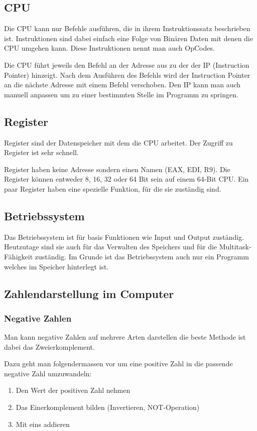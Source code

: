 \documentclass[12pt, a4paper, oneside]{article}
\begin{document}
\subsection{CPU}
Die CPU kann nur Befehle ausführen, die in ihrem Instruktionssatz beschrieben ist. Instruktionen sind dabei einfach eine Folge von Binären Daten mit denen die CPU umgehen kann. Diese Instruktionen nennt man auch OpCodes.

Die CPU führt jeweils den Befehl an der Adresse aus zu der der IP (Instruction Pointer) hinzeigt. Nach dem Ausführen des Befehls wird der Instruction Pointer an die nächste Adresse mit einem Befehl verschoben. Den IP kann man auch manuell anpassen um zu einer bestimmten Stelle im Programm zu springen.

\subsection{Register}
Register sind der Datenspeicher mit dem die CPU arbeitet. Der Zugriff zu Register ist sehr schnell.

Register haben keine Adresse sondern einen Namen (EAX, EDI, R9). Die Register können entweder 8, 16, 32 oder 64 Bit sein auf einem 64-Bit CPU. Ein paar Register haben eine spezielle Funktion, für die sie zuständig sind.

\subsection{Betriebssystem}
Das Betriebssystem ist für basis Funktionen wie Input und Output zuständig. Heutzutage sind sie auch für das Verwalten des Speichers und für die Multitask-Fähigkeit zuständig. Im Grunde ist das Betriebssystem auch nur ein Programm welches im Speicher hinterlegt ist.

\subsection{Zahlendarstellung im Computer}
\subsubsection{Negative Zahlen}
Man kann negative Zahlen auf mehrere Arten darstellen die beste Methode ist dabei das Zweierkomplement.

Dazu geht man folgendermassen vor um eine positive Zahl in die passende negative Zahl umzuwandeln:
\begin{enumerate}
  \item Den Wert der positiven Zahl nehmen
  \item Das Einerkomplement bilden (Invertieren, NOT-Operation)
  \item Mit eins addieren
\end{enumerate}
\end{document}
